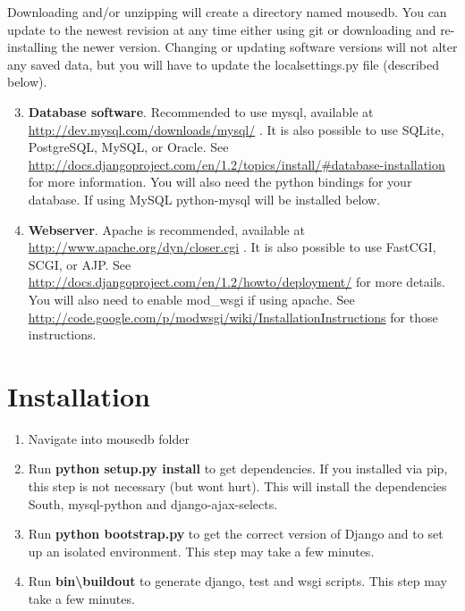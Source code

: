 \documentclass[letterpaper,10pt,english]{sphinxmanual}
\begin{document}
Downloading and/or unzipping will create a directory named mousedb.  You can update to the newest revision at any time either using git or downloading and re-installing the newer version.  Changing or updating software versions will not alter any saved data, but you will have to update the localsettings.py file (described below).

\begin{enumerate}
\setcounter{enumi}{2}
\item {} 
\textbf{Database software}.  Recommended to use mysql, available at \href{http://dev.mysql.com/downloads/mysql/}{http://dev.mysql.com/downloads/mysql/} .  It is also possible to use SQLite, PostgreSQL, MySQL, or Oracle.  See \href{http://docs.djangoproject.com/en/1.2/topics/install/\#database-installation}{http://docs.djangoproject.com/en/1.2/topics/install/\#database-installation} for more information.  You will also need the python bindings for your database.  If using MySQL python-mysql will be installed below.


\item {} 
\textbf{Webserver}.  Apache is recommended, available at \href{http://www.apache.org/dyn/closer.cgi}{http://www.apache.org/dyn/closer.cgi} .  It is also possible to use FastCGI, SCGI, or AJP.  See \href{http://docs.djangoproject.com/en/1.2/howto/deployment/}{http://docs.djangoproject.com/en/1.2/howto/deployment/} for more details.  You will also need to enable mod\_wsgi if using apache.  See \href{http://code.google.com/p/modwsgi/wiki/InstallationInstructions}{http://code.google.com/p/modwsgi/wiki/InstallationInstructions} for those instructions.


\end{enumerate}


\section{Installation}
\label{installation:installation}\begin{enumerate}
\item {} 
Navigate into mousedb folder


\item {} 
Run \textbf{python setup.py install} to get dependencies.  If you installed via pip, this step is not necessary (but wont hurt).  This will install the dependencies South, mysql-python and django-ajax-selects.


\item {} 
Run \textbf{python bootstrap.py} to get the correct version of Django and to set up an isolated environment.  This step may take a few minutes.


\item {} 
Run \textbf{bin\textbackslash{}buildout} to generate django, test and wsgi scripts.  This step may take a few minutes.


\end{enumerate}
\end{document}
